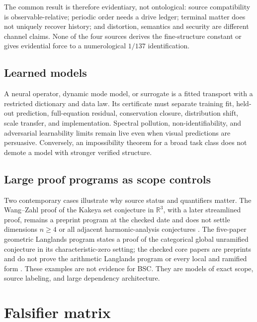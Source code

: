 \documentclass[11pt,a4paper]{article}
\theoremstyle{definition}
\theoremstyle{plain}
\theoremstyle{remark}
\begin{document}
The common result is therefore evidentiary, not ontological: source
compatibility is observable-relative; periodic order needs a drive ledger;
terminal matter does not uniquely recover history; and distortion, semantics
and security are different channel claims.  None of the four sources derives
the fine-structure constant or gives evidential force to a numerological
\(1/137\) identification.

\subsection{Learned models}

A neural operator, dynamic mode model, or surrogate is a fitted transport with
a restricted dictionary and data law.  Its certificate must separate training
fit, held-out prediction, full-equation residual, conservation closure,
distribution shift, scale transfer, and implementation.  Spectral pollution,
non-identifiability, and adversarial learnability limits remain live even when
visual predictions are persuasive.  Conversely, an impossibility theorem for a
broad task class does not demote a model with stronger verified structure.

\subsection{Large proof programs as scope controls}

Two contemporary cases illustrate why source status and quantifiers matter.
The Wang--Zahl proof of the Kakeya set conjecture in \(\mathbb R^3\), with a
later streamlined proof, remains a preprint program at the checked date and
does not settle dimensions \(n\ge4\) or all adjacent harmonic-analysis
conjectures \citep{wangzahl2025,guthwangzahl2026}.  The five-paper geometric
Langlands program states a proof of the categorical global unramified
conjecture in its characteristic-zero setting; the checked core papers are
preprints and do not prove the arithmetic Langlands program or every local and
ramified form
\citep{gaitsgoryraskin1,geometriclanglands2,geometriclanglands3,
geometriclanglands4,gaitsgoryraskin5}.  These examples are not
evidence for BSC.  They are models of exact scope, source labeling, and large
dependency architecture.

\clearpage
\section{Falsifier matrix}\label{sec:falsifiers}
\end{document}
